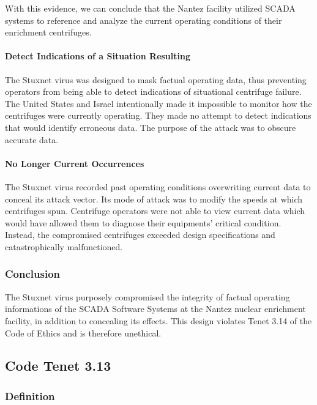 \documentclass[12pt]{article}
\begin{document}
\begin{multicols}{2}
With this evidence, we can conclude that the Nantez facility utilized SCADA systems to reference and analyze the current operating conditions of their enrichment centrifuges.


\paragraph{Detect Indications of a Situation Resulting}

The Stuxnet virus was designed to mask factual operating data, thus preventing operators from being able to detect indications of situational centrifuge failure. The United States and Israel intentionally made it impossible to monitor how the centrifuges were currently operating. They made no attempt to detect indications that would identify erroneous data. The purpose of the attack was to obscure accurate data.

\paragraph{No Longer Current Occurrences}

The Stuxnet virus recorded past operating conditions overwriting current data to conceal its attack vector.  Its mode of attack was to modify the speeds at which centrifuges spun. Centrifuge operators were not able to view current data which would have allowed them to diagnose their equipments’ critical condition. Instead, the compromised centrifuges exceeded design specifications and catastrophically malfunctioned.

\subsubsection{Conclusion}

The Stuxnet virus purposely compromised the integrity of factual operating informations of the SCADA Software Systems at the Nantez nuclear enrichment facility, in addition to concealing its effects. This design violates Tenet 3.14 of the Code of Ethics and is therefore unethical.


\subsection{Code Tenet 3.13}

\subsubsection{Definition}


\end{multicols}
\end{document}
